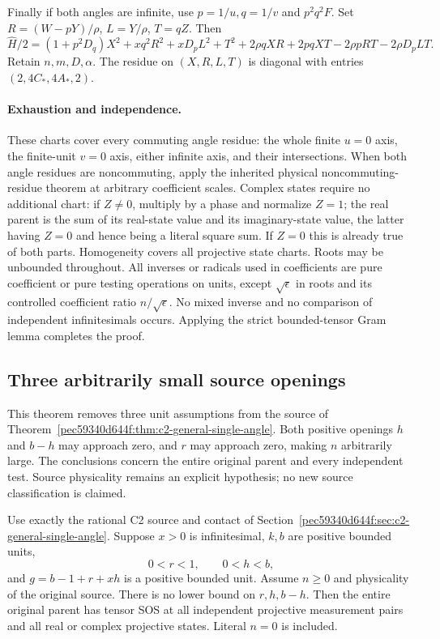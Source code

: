 Finally if both angles are infinite, use $p=1/u,q=1/v$ and
$p^2q^2F$.  Set $R=(W-pY)/\rho$, $L=Y/\rho$, $T=qZ$.  Then
\[
 \widehat H/2=(1+p^2D_q)X^2+xq^2R^2+xD_pL^2+T^2
       +2\rho qXR+2pqXT-2\rho pRT-2\rho D_pLT.
\]
Retain $n,m,D,\alpha$.  The residue on $(X,R,L,T)$ is
diagonal with entries $(2,4C_*,4A_*,2)$.

\paragraph{Exhaustion and independence.}
These charts cover every commuting angle residue: the whole finite
$u=0$ axis, the finite-unit $v=0$ axis, either infinite axis, and
their intersections.  When both angle residues are noncommuting,
apply the inherited physical noncommuting-residue theorem at arbitrary
coefficient scales.  Complex states require no additional chart:
if $Z\ne0$, multiply by a phase and normalize $Z=1$; the real parent
is the sum of its real-state value and its imaginary-state value,
the latter having $Z=0$ and hence being a literal square sum.
If $Z=0$ this is already true of both parts.  Homogeneity covers all
projective state charts.  Roots may be unbounded throughout.
All inverses or radicals used in coefficients are pure coefficient
or pure testing operations on units, except $\sqrt\epsilon$ in
roots and its controlled coefficient ratio $n/\sqrt\epsilon$.
No mixed inverse and no comparison of independent infinitesimals
occurs.  Applying the strict bounded-tensor Gram lemma completes
the proof.

\subsection{Three arbitrarily small source openings}
\label{component:p81893ad08bed}

\label{p81893ad08bed:sec:c2-three-openings}

This theorem removes three unit assumptions from the source of
Theorem~\ref{pec59340d644f:thm:c2-general-single-angle}.  Both positive openings $h$
and $b-h$ may approach zero, and $r$ may approach zero, making $n$
arbitrarily large.  The conclusions concern the entire original parent
and every independent test.  Source physicality remains an explicit
hypothesis; no new source classification is claimed.

\begin{theorem}
\label{p81893ad08bed:thm:c2-three-openings}
Use exactly the rational C2 source and contact of
Section~\ref{pec59340d644f:sec:c2-general-single-angle}.  Suppose $x>0$ is
infinitesimal, $k,b$ are positive bounded units,
\[
             0<r<1,\qquad 0<h<b,
\]
and $g=b-1+r+xh$ is a positive bounded unit.  Assume $n\geq0$
and physicality of the original source.  There is no lower bound on
$r,h,b-h$.  Then the entire original parent has tensor SOS at all
independent projective measurement pairs and all real or complex
projective states.  Literal $n=0$ is included.
\end{theorem}

